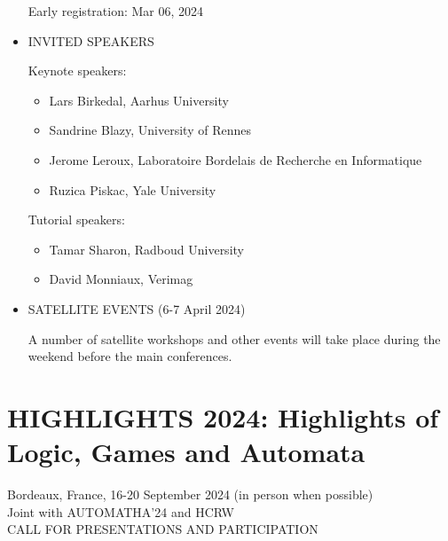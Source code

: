 \documentclass[prodmode,acmtecs]{acmsmall} %
\begin{document}
\begin{itemize}
Early registration: Mar 06, 2024 
 
\item  INVITED SPEAKERS  
 
 Keynote speakers: 
 
\begin{itemize}\item  Lars Birkedal, Aarhus University
\item  Sandrine Blazy, University of Rennes
\item  Jerome Leroux, Laboratoire Bordelais de Recherche en Informatique
\item  Ruzica Piskac, Yale University
\end{itemize} 
  Tutorial speakers: 
 
\begin{itemize}\item  Tamar Sharon, Radboud University
\item  David Monniaux, Verimag
\end{itemize} 
\item  SATELLITE EVENTS (6-7 April 2024) 
 
  A number of satellite workshops and other events will take place during the weekend before the main conferences. 
 
\end{itemize}\section{HIGHLIGHTS 2024: Highlights of Logic, Games and Automata}\label{HIGHLIGHTS2024}  Bordeaux, France, 16-20 September 2024 (in person when possible) \\ 
  Joint with AUTOMATHA’24 and HCRW\\ 
CALL FOR PRESENTATIONS AND PARTICIPATION 
\end{document}
